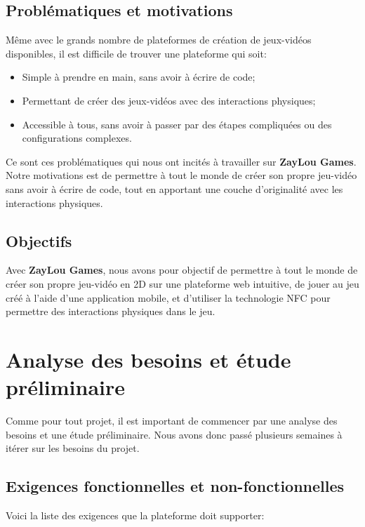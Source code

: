 \documentclass[12pt]{article}        %
\begin{document}
\subsection{Problématiques et motivations}               
\label{subsec:Problématiques et motivations}          
Même avec le grands nombre de plateformes de création de jeux-vidéos
disponibles, il est difficile de trouver une plateforme qui soit:
\begin{itemize}
    \item Simple à prendre en main, sans avoir à écrire de code;
    \item Permettant de créer des jeux-vidéos avec des interactions 
    physiques;
    \item Accessible à tous, sans avoir à passer par des étapes 
    compliquées
    ou des configurations complexes.
\end{itemize}
Ce sont ces problématiques qui nous ont incités à travailler sur 
\textbf{ZayLou Games}. Notre motivations est de permettre à tout le monde 
de créer son propre jeu-vidéo sans avoir à écrire de code, tout en 
apportant une couche d'originalité avec les interactions physiques.

\subsection{Objectifs}             
\label{subsec:objectifs}             
Avec \textbf{ZayLou Games}, nous avons pour objectif de permettre à tout 
le monde de créer son propre jeu-vidéo en 2D sur une plateforme web 
intuitive, de jouer au jeu créé à l'aide d'une application mobile, et 
d'utiliser la technologie NFC pour permettre des interactions physiques 
dans le jeu.

\newpage                            

\section{Analyse des besoins et étude préliminaire}              
\label{sec:Analyse}                                              
Comme pour tout projet, il est important de commencer par une analyse 
des besoins et une étude préliminaire. Nous avons donc passé plusieurs 
semaines à itérer sur les besoins du projet.

\subsection{Exigences fonctionnelles et non-fonctionnelles}              
\label{subsec:Exigences}          
Voici la liste des exigences que la plateforme doit supporter:
\end{document}
